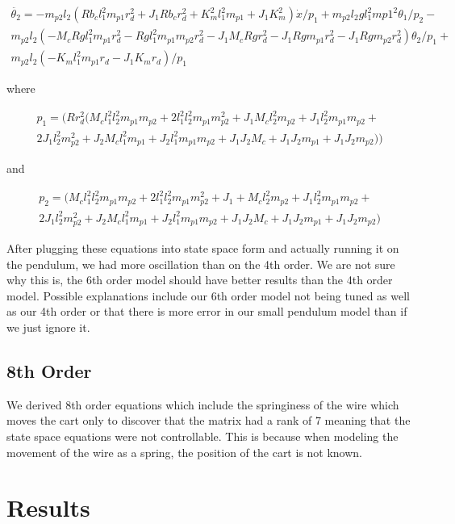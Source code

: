 \documentclass{article}
\begin{document}
\begin{multline} 
\label{eqn6th6}
\ddot{\theta_2} = -m_{p2} l_2 (R b_c l_1^2 m_{p1} r_d^2+J_1 R b_c r_d^2+K_m^2 l_1^2 m_{p1}+J_1 K_m^2)\dot{x}/p_1 +m_{p2} l_2 g l_1^2 m{p1}^2 \theta_1/p_2 - \\m_{p2} l_2 (-M_c R g l_1^2 m_{p1} r_d^2-R g l_1^2 m_{p1} m_{p2} r_d^2-J_1 M_c R g r_d^2-J_1 R g m_{p1} r_d^2-J_1 R g m_{p2} r_d^2) \theta_2/p_1 + \\m_{p2} l_2 (-K_m l_1^2 m_{p1} r_d-J_1 K_m r_d)/p_1
\end{multline}

where 

\begin{multline} 
\label{p1}
p_1 = (R r_d^2 (M_c l_1^2 l_2^2 m_{p1} m_{p2}+2 l_1^2 l_2^2 m_{p1} m_{p2}^2+J_1 M_c l_2^2 m_{p2}+J_1 l_2^2 m_{p1} m_{p2}+\\2 J_1 l_2^2 m_{p2}^2+J_2 M_c l_1^2 m_{p1}+J_2 l_1^2 m_{p1} m_{p2}+J_1 J_2 M_c+J_1 J_2 m_{p1}+J_1 J_2 m_{p2}))
\end{multline}

and 

\begin{multline*} 
\label{p2}
 p_2 = (M_c l_1^2 l_2^2 m_{p1}m_{p2}+2 l_1^2 l_2^2 m_{p1} m_{p2}^2+J_1+M_c l_2^2 m_{p2}+J_1 l_2^2 m_{p1} m_{p2}+\\2 J_1 l_2^2 m_{p2}^2+J_2 M_c l_1^2 m_{p1}+J_2 l_1^2 m_{p1} m_{p2}+J_1 J_2 M_c+J_1 J_2 m_{p1}+J_1 J_2 m_{p2})
\end{multline*}

After plugging these equations into state space form and actually running it on the pendulum, we had more oscillation than on the 4th order. We are not sure why this is, the 6th order model should have better results than the 4th order model. Possible explanations include our 6th order model not being tuned as well as our 4th order or that there is more error in our small pendulum model than if we just ignore it.

\subsection{8th Order}
We derived 8th order equations which include the springiness of the wire which moves the cart only to discover that the matrix had a rank of 7 meaning that the state space equations were not controllable. This is because when modeling the movement of the wire as a spring, the position of the cart is not known. 

\section{Results}
\end{document}
